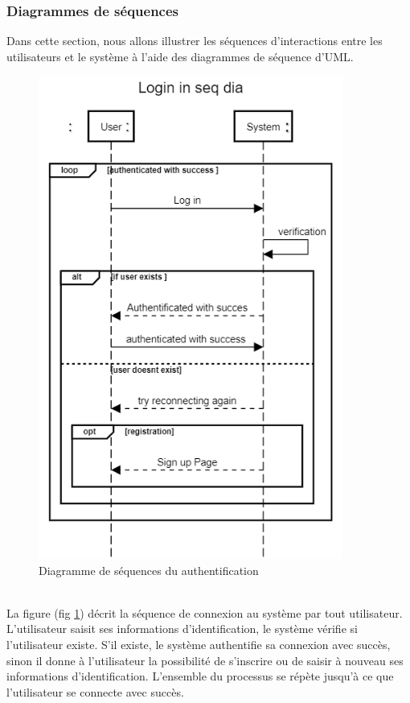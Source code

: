 \documentclass[french, a4paper, 12pt]{report}
\begin{document}
		\subsubsection{Diagrammes de séquences} Dans cette section, nous allons illustrer les séquences d'interactions entre les utilisateurs et le système à l'aide des diagrammes de séquence d'UML.
			\begin{figure}[h!]
  				\center
  				\includegraphics[width=10cm]{seqlogin.png}
  				\caption{Diagramme de séquences du authentification}
  				\label{fig:seqlogin}
			\end{figure} \\La figure (fig \ref{fig:seqlogin}) décrit la séquence de connexion au système par tout utilisateur. L'utilisateur saisit ses informations d'identification, le système vérifie si l'utilisateur existe. S'il existe, le système authentifie sa connexion avec succès, sinon il donne à l'utilisateur la possibilité de s'inscrire ou de saisir à nouveau ses informations d'identification. L'ensemble du processus se répète jusqu'à ce que l'utilisateur se connecte avec succès.
			
\end{document}
